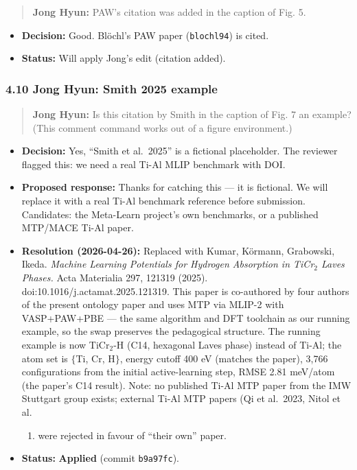 \begin{quote}
\textbf{Jong Hyun:} PAW's citation was added in the caption of Fig. 5.
\end{quote}

\begin{itemize}
\tightlist
\item
  \textbf{Decision:} Good. Blöchl's PAW paper (\texttt{blochl94}) is cited.
\item
  \textbf{Status:} {\color{green!60!black}\faCheckCircle} Will apply Jong's edit (citation added).
\end{itemize}

\subsubsection{4.10 Jong Hyun: Smith 2025 example}\label{jong-hyun-smith-2025-example}

\begin{quote}
\textbf{Jong Hyun:} Is this citation by Smith in the caption of Fig. 7 an example? (This comment command works out of a figure environment.)
\end{quote}

\begin{itemize}
\tightlist
\item
  \textbf{Decision:} Yes, ``Smith et al.~2025'' is a fictional placeholder. The reviewer flagged this: we need a real Ti-Al MLIP benchmark with DOI.
\item
  \textbf{Proposed response:} Thanks for catching this --- it is fictional. We will replace it with a real Ti-Al benchmark reference before submission. Candidates: the Meta-Learn project's own benchmarks, or a published MTP/MACE Ti-Al paper.
\item
  \textbf{Resolution (2026-04-26):} Replaced with Kumar, Körmann, Grabowski, Ikeda. \emph{Machine Learning Potentials for Hydrogen Absorption in TiCr\(_2\) Laves Phases.} Acta Materialia 297, 121319 (2025). doi:10.1016/j.actamat.2025.121319. This paper is co-authored by four authors of the present ontology paper and uses MTP via MLIP-2 with VASP+PAW+PBE --- the same algorithm and DFT toolchain as our running example, so the swap preserves the pedagogical structure. The running example is now TiCr\(_2\)-H (C14, hexagonal Laves phase) instead of Ti-Al; the atom set is \(\{\)Ti, Cr, H\(\}\), energy cutoff 400 eV (matches the paper), 3,766 configurations from the initial active-learning step, RMSE 2.81 meV/atom (the paper's C14 result). Note: no published Ti-Al MTP paper from the IMW Stuttgart group exists; external Ti-Al MTP papers (Qi et al.~2023, Nitol et al.

  \begin{enumerate}
  \def\labelenumi{\arabic{enumi})}
  \setcounter{enumi}{2024}
  \tightlist
  \item
    were rejected in favour of ``their own'' paper.
  \end{enumerate}
\item
  \textbf{Status:} {\color{green!60!black}\faCheckCircle} \textbf{Applied} (commit \texttt{b9a97fc}).
\end{itemize}

